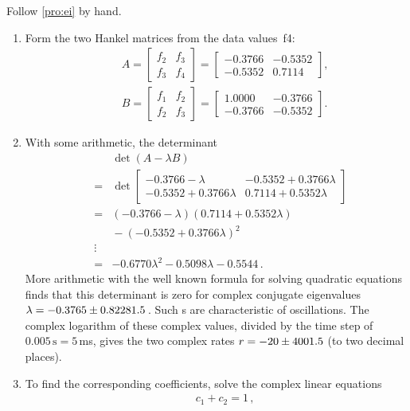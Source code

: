 \begin{reduce}
\begin{example}
\begin{solution} 
Follow \autoref{pro:ei} by hand. 
\begin{enumerate}
\item 
Form the two Hankel matrices from the data values~\hlist f4:
\begin{eqnarray*}&&
A=\begin{bmatrix} f_2&f_3\\f_3&f_4 \end{bmatrix}
=\begin{bmatrix} -0.3766 & -0.5352
\\  -0.5352&   0.7114 \end{bmatrix},
\\&&
B=\begin{bmatrix} f_1&f_2\\f_2&f_3 \end{bmatrix}
=\begin{bmatrix} 1.0000&  -0.3766
\\  -0.3766&  -0.5352 \end{bmatrix}.
\end{eqnarray*}
\item 
With some arithmetic, the determinant 
\begin{eqnarray*}
&&\det(A-\lambda B)
\\&=&\det\begin{bmatrix} -0.3766-\lambda & -0.5352+0.3766\lambda
\\  -0.5352+0.3766\lambda&   0.7114+0.5352\lambda \end{bmatrix} 
\\&=&(-0.3766-\lambda)(0.7114+0.5352\lambda)
\\&&{}
-(-0.5352+0.3766\lambda)^2
\\&\vdots& 
\\&=& -0.6770\lambda^2  -0.5098\lambda  -0.5544\,.
\end{eqnarray*}
More arithmetic with the well known formula for solving quadratic equations finds that this determinant is zero for complex conjugate eigenvalues \(\lambda=-0.3765 \pm 0.82281.5\)\,.
Such s are characteristic of oscillations.
The complex logarithm of these complex values, divided by the time step of \(0.005\,\text{s}=5\,\)ms, gives the two complex rates \(r=-20\pm4001.5\) (to two decimal places).
\item 
To find the corresponding coefficients, solve the complex linear equations
\begin{eqnarray*}&&
c_1+c_2=1\,, 
\\&&

\end{eqnarray*}
\end{enumerate}
\end{solution}
\end{example}
\end{reduce}

